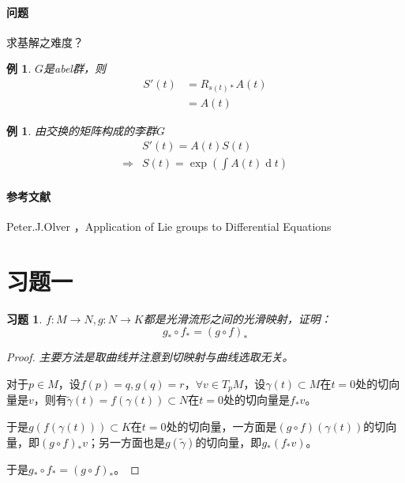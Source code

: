 \documentclass[winfonts,UTF8,c5size,a4paper,fancyhdr,hyperref,titlepage,nocap]{ctexart}
\newtheorem{xiti}{习题}
\newtheorem{exa}[thm]{例}
\theoremstyle{definition}
\theoremstyle{remark}
\numberwithin{equation}{subsection}
\newcommand{\dd}{\operatorname{d}}
\begin{document}
\paragraph{问题}求基解之难度？
\begin{exa}
$G$是abel群，则
\begin{align*}
S'(t)&=R_{s(t)\ast}A(t)\\
     &=A(t)
\end{align*}
\end{exa}

\begin{exa}
由交换的矩阵构成的李群$G$
\begin{align*}
&S'(t)=A(t)S(t)\\
\Longrightarrow&S(t)=\exp(\int A(t)\dd t)
\end{align*}
\end{exa}

\paragraph{参考文献}
Peter.J.Olver ，Application of Lie groups to Differential Equations


\section{习题一}
\begin{xiti}
  $f\colon M\to N,g\colon N\to K$都是光滑流形之间的光滑映射，证明：
  \begin{equation*}
    g_{\ast}\circ f_{\ast}=(g\circ f)_{\ast}
  \end{equation*}
\end{xiti}
\begin{proof}
  \emph{主要方法是取曲线并注意到切映射与曲线选取无关。}

对于$p\in M$，设$f(p)=q,g(q)=r$，$\forall v\in T_pM$，设$\gamma(t)\subset M$在$t=0$处的切向量是$v$，则有$\widetilde{\gamma}(t)=f(\gamma(t))\subset N$在$t=0$处的切向量是$f_{\ast}v$。

于是$g(f(\gamma(t)))\subset K$在$t=0$处的切向量，一方面是$(g\circ f)(\gamma(t))$的切向量，即$(g\circ f)_{\ast}v$；另一方面也是$g(\widetilde{\gamma})$的切向量，即$g_{\ast}(f_{\ast}v)$。

于是$g_{\ast}\circ f_{\ast}=(g\circ f)_{\ast}$。
\end{proof}
\end{document}
